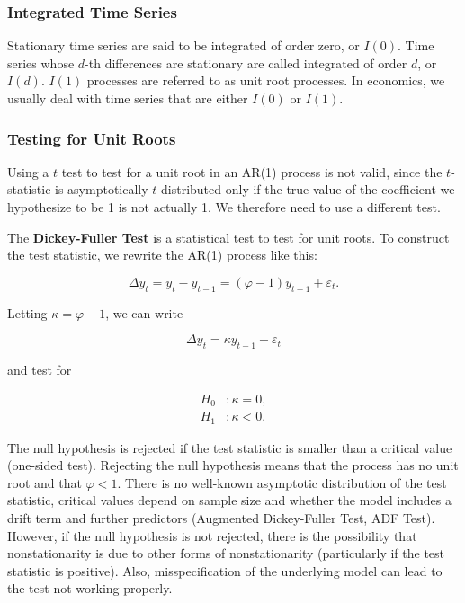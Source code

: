 \subsubsection{Integrated Time Series}

Stationary time series are said to be integrated of order zero, or $I(0)$. Time series whose $d$-th differences are stationary are called integrated of order $d$, or $I(d)$. $I(1)$ processes are referred to as unit root processes. In economics, we usually deal with time series that are either $I(0)$ or $I(1)$. 

\subsubsection{Testing for Unit Roots}

Using a $t$ test to test for a unit root in an AR(1) process is not valid, since the $t$-statistic is asymptotically $t$-distributed only if the true value of the coefficient we hypothesize to be 1 is not actually 1. We therefore need to use a different test.

The \textbf{Dickey-Fuller Test} is a statistical test to test for unit roots. To construct the test statistic, we rewrite the AR(1) process like this:

\[
	\Delta y_t = y_t - y_{t-1} = (\varphi-1) y_{t-1} + \varepsilon_t.
\] 

Letting $\kappa = \varphi - 1$, we can write

\begin{equation}
	\Delta y_t = \kappa y_{t-1} + \varepsilon_t 
\end{equation}

and test for 

\begin{align*}
	H_0&: \kappa = 0, \\
	H_1&: \kappa < 0.
\end{align*}

The null hypothesis is rejected if the test statistic is smaller than a critical value (one-sided test). Rejecting the null hypothesis means that the process has no unit root and that $\varphi < 1$. There is no well-known asymptotic distribution of the test statistic, critical values depend on sample size and whether the model includes a drift term and further predictors (Augmented Dickey-Fuller Test, ADF Test). However, if the null hypothesis is not rejected, there is the possibility that nonstationarity is due to other forms of nonstationarity (particularly if the test statistic is positive). Also, misspecification of the underlying model can lead to the test not working properly.

